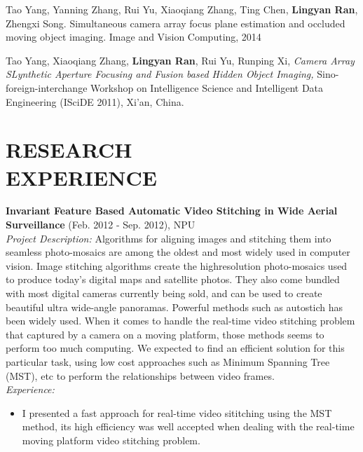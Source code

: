 \documentclass[margin]{res}
\begin{document}
\begin{resume}
                Tao Yang, Yanning Zhang, Rui Yu, Xiaoqiang Zhang, Ting Chen, \textbf{Lingyan Ran}, Zhengxi Song. Simultaneous
                camera array focus plane estimation and occluded moving object imaging. Image and Vision Computing, 2014

                Tao Yang, Xiaoqiang Zhang, \textbf{Lingyan Ran}, Rui Yu, Runping Xi, {\sl Camera Array SLynthetic Aperture Focusing and
                Fusion based Hidden Object Imaging,} Sino-foreign-interchange Workshop on Intelligence Science and Intelligent
                Data Engineering (ISciDE 2011), Xi’an, China.

\section{RESEARCH \\EXPERIENCE}

                {\bf Invariant Feature Based Automatic Video Stitching in Wide Aerial Surveillance} \hfill (Feb. 2012 - Sep. 2012), NPU\\
                {\sl Project Description: } Algorithms for aligning images and stitching them into seamless photo-mosaics are among the
                oldest and most widely used in computer vision. Image stitching algorithms create the highresolution
                photo-mosaics used to produce today’s digital maps and satellite photos. They also
                come bundled with most digital cameras currently being sold, and can be used to create beautiful
                ultra wide-angle panoramas. Powerful methods such as autostich has been widely used. When it comes to handle the real-time video stitching problem that captured by a camera on a moving platform, those methods seems to perform too much computing. We expected to find an efficient solution for this particular task, using low cost approaches such as Minimum Spanning Tree (MST), etc to perform the relationships between video frames.\\
                {\sl Experience: }
                \begin{itemize} \itemsep -2pt
                \item I presented a fast approach for real-time video sititching using the MST method, its high efficiency was well accepted when dealing with the real-time moving platform video stitching problem.
                \end{itemize}


\end{resume}
\end{document}
